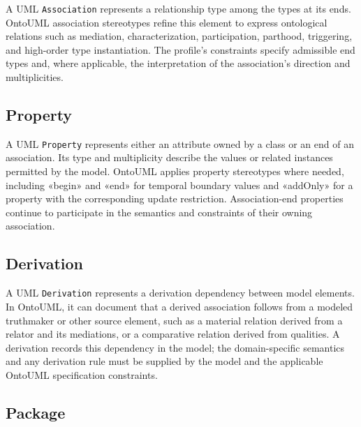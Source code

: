 A UML \texttt{Association} represents a relationship type among the types at its ends. OntoUML association stereotypes refine this element to express ontological relations such as mediation, characterization, participation, parthood, triggering, and high-order type instantiation. The profile's constraints specify admissible end types and, where applicable, the interpretation of the association's direction and multiplicities.


\subsection{Property}

A UML \texttt{Property} represents either an attribute owned by a class or an end of an association. Its type and multiplicity describe the values or related instances permitted by the model. OntoUML applies property stereotypes where needed, including «begin» and «end» for temporal boundary values and «addOnly» for a property with the corresponding update restriction. Association-end properties continue to participate in the semantics and constraints of their owning association.

\subsection{Derivation}

A UML \texttt{Derivation} represents a derivation dependency between model elements. In OntoUML, it can document that a derived association follows from a modeled truthmaker \cite{guizzardi2024explanation,guarino2015we} or other source element, such as a material relation derived from a relator and its mediations, or a comparative relation derived from qualities. A derivation records this dependency in the model; the domain-specific semantics and any derivation rule must be supplied by the model and the applicable OntoUML specification constraints.

\subsection{Package}

